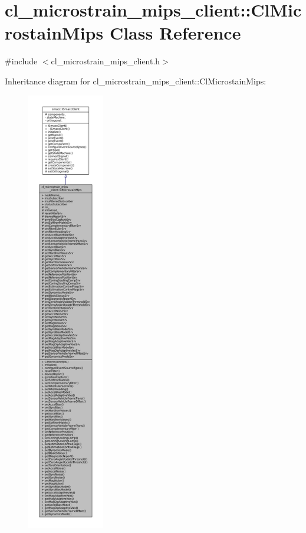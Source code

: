 \hypertarget{classcl__microstrain__mips__client_1_1ClMicrostainMips}{}\section{cl\+\_\+microstrain\+\_\+mips\+\_\+client\+:\+:Cl\+Microstain\+Mips Class Reference}
\label{classcl__microstrain__mips__client_1_1ClMicrostainMips}


{\ttfamily \#include $<$cl\+\_\+microstrain\+\_\+mips\+\_\+client.\+h$>$}



Inheritance diagram for cl\+\_\+microstrain\+\_\+mips\+\_\+client\+:\+:Cl\+Microstain\+Mips\+:
\nopagebreak
\begin{figure}[H]
\begin{center}
\leavevmode
\includegraphics[height=550pt]{classcl__microstrain__mips__client_1_1ClMicrostainMips__inherit__graph}
\end{center}
\end{figure}


